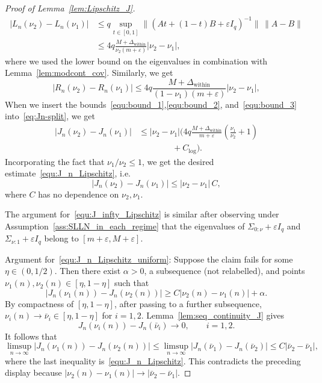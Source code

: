 \documentclass[10pt, letterpaper]{amsart}
\begin{document}
\begin{proof}[Proof of Lemma~\ref{lem:Lipschitz_J}]
\begin{align}
|L_n(\nu_2)-L_n(\nu_1)|
& \leq q \sup\limits_{t\in [0,1]} \|(At+(1-t)B+\varepsilon I_q)^{-1}\|\,\|A-B\| \\
& \leq 4q\frac{M+\Delta_{\mathrm{within}}}{\nu_2(m+\varepsilon)}|\nu_2-\nu_1|, \label{equ:bound_2}
\end{align}
where we used the lower bound on the eigenvalues in combination with Lemma~\ref{lem:modcont_cov}. Similarly, we get
\begin{equation}
|R_n(\nu_2)-R_n(\nu_1)|
\leq 4q\frac{M+\Delta_{\mathrm{within}}}{(1-\nu_1)(m+\varepsilon)}|\nu_2-\nu_1|, \label{equ:bound_3}
\end{equation}
When we insert the bounds~\eqref{equ:bound_1},\eqref{equ:bound_2}, and~\eqref{equ:bound_3} into~\eqref{eq:Jn-split}, we get
\[
\begin{aligned}
|J_n(\nu_2)-J_n(\nu_1)|
&\leq |\nu_2-\nu_1|\Bigg(
4q
\frac{M+\Delta_{\mathrm{within}}}{m+\varepsilon}
\left(\frac{\nu_1}{\nu_2}+1\right)\\
&\qquad\qquad
+C_{\log}\Bigg).
\end{aligned}
\]
Incorporating the fact that \(\nu_1/\nu_2\leq 1\), we get the desired estimate~\eqref{equ:J_n_Lipschitz}, i.e.
\[
|J_n(\nu_2)-J_n(\nu_1)|\leq |\nu_2-\nu_1|\,C,
\]
where \(C\) has no dependence on \(\nu_2,\nu_1\).

The argument for~\eqref{equ:J_infty_Lipschitz} is similar after observing
under Assumption~\ref{ass:SLLN_in_each_regime} that the eigenvalues of
$\Sigma_{0:\nu}+\varepsilon I_q$ and $\Sigma_{\nu:1}+\varepsilon I_q$
belong to $[m+\varepsilon,M+\varepsilon]$.

Argument for~\eqref{equ:J_n_Lipschitz_uniform}: Suppose the claim fails for some $\eta\in(0,1/2)$. Then there exist $\alpha>0$, a subsequence (not relabelled), and points $\nu_1(n),\nu_2(n)\in[\eta,1-\eta]$ such that
\[
|J_n(\nu_1(n))-J_n(\nu_2(n))|
\geq C|\nu_2(n)-\nu_1(n)|+\alpha.
\]
By compactness of $[\eta,1-\eta]$, after passing to a further subsequence,
$\nu_i(n)\to\bar\nu_i\in[\eta,1-\eta]$ for $i=1,2$.
Lemma~\ref{lem:seq_continuity_J} gives
\[
J_n(\nu_i(n))-J_n(\bar\nu_i)\longrightarrow0,\qquad i=1,2.
\]
It follows that
\[
\limsup_{n\to\infty}|J_n(\nu_1(n))-J_n(\nu_2(n))|
\leq
\limsup_{n\to\infty}|J_n(\bar\nu_1)-J_n(\bar\nu_2)|
\leq C|\bar\nu_2-\bar\nu_1|,
\]
where the last inequality is~\eqref{equ:J_n_Lipschitz}. This contradicts the
preceding display because
$|\nu_2(n)-\nu_1(n)|\to|\bar\nu_2-\bar\nu_1|$.
\end{proof}
\end{document}
